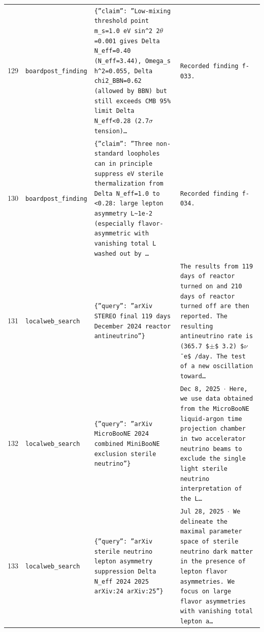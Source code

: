 \documentclass[11pt,a4paper]{article}
\begin{document}
\begin{longtable}{@{}p{}p{}p{}p{}@{}}
129 & \texttt{board}\newline\texttt{post\_\allowbreak{}finding} & \texttt{\{''claim'':\allowbreak{} ''Low-mixing threshold point m\_\allowbreak{}s=\allowbreak{}1.0 eV sin\textasciicircum{}\allowbreak{}2 2$\theta$=\allowbreak{}0.001 gives Delta N\_\allowbreak{}eff=\allowbreak{}0.40 (N\_\allowbreak{}eff=\allowbreak{}3.44)\allowbreak{},\allowbreak{} Omega\_\allowbreak{}s h\textasciicircum{}\allowbreak{}2=\allowbreak{}0.055,\allowbreak{} Delta chi2\_\allowbreak{}BBN=\allowbreak{}0.62 (allowed by BBN)\allowbreak{} but still exceeds CMB 95\% limit Delta N\_\allowbreak{}eff\textless{}\allowbreak{}0.28 (2.7$\sigma$ tension)\allowbreak{}\ldots{}\allowbreak{}} & \texttt{Recorded finding f-033.} \\
130 & \texttt{board}\newline\texttt{post\_\allowbreak{}finding} & \texttt{\{''claim'':\allowbreak{} ''Three non-standard loopholes can in principle suppress eV sterile thermalization from Delta N\_\allowbreak{}eff=\allowbreak{}1.0 to \textless{}\allowbreak{}0.28:\allowbreak{} large lepton asymmetry L\textasciitilde{}\allowbreak{}1e-2 (especially flavor-asymmetric with vanishing total L washed out by \ldots{}\allowbreak{}} & \texttt{Recorded finding f-034.} \\
131 & \texttt{local}\newline\texttt{web\_\allowbreak{}search} & \texttt{\{''query'':\allowbreak{} ''arXiv STEREO final 119 days December 2024 reactor antineutrino''\}\allowbreak{}} & \texttt{The results from 119 days of reactor turned on and 210 days of reactor turned off are then reported. The resulting antineutrino rate is (365.7 \$$\pm$\$ 3.2)\allowbreak{} \$$\nu$¯e\$ /\allowbreak{}day. The test of a new oscillation toward\ldots{}\allowbreak{}} \\
132 & \texttt{local}\newline\texttt{web\_\allowbreak{}search} & \texttt{\{''query'':\allowbreak{} ''arXiv MicroBooNE 2024 combined MiniBooNE exclusion sterile neutrino''\}\allowbreak{}} & \texttt{Dec 8,\allowbreak{} 2025 $\cdot$ Here,\allowbreak{} we use data obtained from the MicroBooNE liquid-argon time projection chamber in two accelerator neutrino beams to exclude the single light sterile neutrino interpretation of the L\ldots{}\allowbreak{}} \\
133 & \texttt{local}\newline\texttt{web\_\allowbreak{}search} & \texttt{\{''query'':\allowbreak{} ''arXiv sterile neutrino lepton asymmetry suppression Delta N\_\allowbreak{}eff 2024 2025 arXiv:\allowbreak{}24 arXiv:\allowbreak{}25''\}\allowbreak{}} & \texttt{Jul 28,\allowbreak{} 2025 $\cdot$ We delineate the maximal parameter space of sterile neutrino dark matter in the presence of lepton flavor asymmetries. We focus on large flavor asymmetries with vanishing total lepton a\ldots{}\allowbreak{}} \\

\end{longtable}
\end{document}
